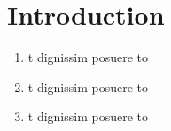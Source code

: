 \chapter{Introduction}

\begin{enumerate}
  \item t dignissim posuere to
  \item t dignissim posuere to
  \item t dignissim posuere to
\end{enumerate}
